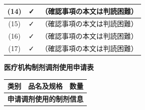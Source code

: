 \documentclass[UTF8,10pt,a4paper,fontset=fandol]{ctexart}
\newcommand{\fieldvalue}[1]{#1}
\newcommand{\handwritten}[1]{#1}
\begin{document}
\begin{tabularx}{\textwidth}{|c|c|X|}
\hline
(14) &
\fieldvalue{\handwritten{✓}}
&
（確認事項の本文は判読困難） \\
\hline
(15) &
\fieldvalue{\handwritten{✓}}
&
（確認事項の本文は判読困難） \\
\hline
(16) &
\fieldvalue{\handwritten{✓}}
&
（確認事項の本文は判読困難） \\
\hline
(17) &
\fieldvalue{\handwritten{✓}}
&
（確認事項の本文は判読困難） \\
\hline
\end{tabularx}


\newpage

\begin{center}
\textbf{医疗机构制剂调剂使用申请表}
\end{center}

\noindent
\begin{tabularx}{\textwidth}{|p{}|X|p{}|}
\hline
\textbf{类别} & \textbf{品名及规格} & \textbf{数量} \\
\hline
\multicolumn{3}{|l|}{\textbf{申请调剂使用的制剂信息}} \\
\hline
\end{tabularx}

\vspace{2mm}
\end{document}
